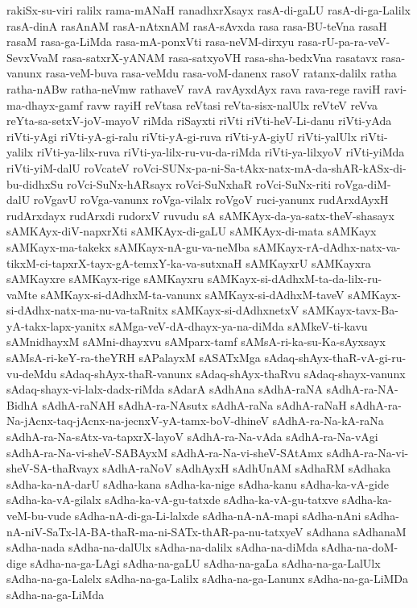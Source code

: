 {rakiSx-su-viri
ralilx
rama-mANaH
ranadhxrXsayx
rasA-di-gaLU
rasA-di-ga-Lalilx
rasA-dinA
rasAnAM
rasA-nAtxnAM
rasA-sAvxda
rasa
rasa-BU-teVna
rasaH
rasaM
rasa-ga-LiMda
rasa-mA-ponxVti
rasa-neVM-dirxyu
rasa-rU-pa-ra-veV-SevxVvaM
rasa-satxrX-yANAM
rasa-satxyoVH
rasa-sha-bedxVna
rasatavx
rasa-vanunx
rasa-veM-buva
rasa-veMdu
rasa-voM-danenx
rasoV
ratanx-dalilx
ratha
ratha-nABw
ratha-neVmw
rathaveV
ravA
ravAyxdAyx
rava
rava-rege
raviH
ravi-ma-dhayx-gamf
ravw
rayiH
reVtasa
reVtasi
reVta-sisx-nalUlx
reVteV
reVva
reYta-sa-setxV-joV-mayoV
riMda
riSayxti
riVti
riVti-heV-Li-danu
riVti-yAda
riVti-yAgi
riVti-yA-gi-ralu
riVti-yA-gi-ruva
riVti-yA-giyU
riVti-yalUlx
riVti-yalilx
riVti-ya-lilx-ruva
riVti-ya-lilx-ru-vu-da-riMda
riVti-ya-lilxyoV
riVti-yiMda
riVti-yiM-dalU
roVcateV
roVci-SUNx-pa-ni-Sa-tAkx-natx-mA-da-shAR-kASx-di-bu-didhxSu
roVci-SuNx-hARsayx
roVci-SuNxhaR
roVci-SuNx-riti
roVga-diM-dalU
roVgavU
roVga-vanunx
roVga-vilalx
roVgoV
ruci-yanunx
rudArxdAyxH
rudArxdayx
rudArxdi
rudorxV
ruvudu
sA
sAMKAyx-da-ya-satx-theV-shasayx
sAMKAyx-diV-napxrXti
sAMKAyx-di-gaLU
sAMKAyx-di-mata
sAMKayx
sAMKayx-ma-takekx
sAMKayx-nA-gu-va-neMba
sAMKayx-rA-dAdhx-natx-va-tikxM-ci-tapxrX-tayx-gA-temxY-ka-va-sutxnaH
sAMKayxrU
sAMKayxra
sAMKayxre
sAMKayx-rige
sAMKayxru
sAMKayx-si-dAdhxM-ta-da-lilx-ru-vaMte
sAMKayx-si-dAdhxM-ta-vanunx
sAMKayx-si-dAdhxM-taveV
sAMKayx-si-dAdhx-natx-ma-nu-va-taRnitx
sAMKayx-si-dAdhxnetxV
sAMKayx-tavx-Ba-yA-takx-lapx-yanitx
sAMga-veV-dA-dhayx-ya-na-diMda
sAMkeV-ti-kavu
sAMnidhayxM
sAMni-dhayxvu
sAMparx-tamf
sAMsA-ri-ka-su-Ka-sAyxsayx
sAMsA-ri-keY-ra-theYRH
sAPalayxM
sASATxMga
sAdaq-shAyx-thaR-vA-gi-ru-vu-deMdu
sAdaq-shAyx-thaR-vanunx
sAdaq-shAyx-thaRvu
sAdaq-shayx-vanunx
sAdaq-shayx-vi-lalx-dadx-riMda
sAdarA
sAdhAna
sAdhA-raNA
sAdhA-ra-NA-BidhA
sAdhA-raNAH
sAdhA-ra-NAsutx
sAdhA-raNa
sAdhA-raNaH
sAdhA-ra-Na-jAcnx-taq-jAcnx-na-jecnxV-yA-tamx-boV-dhineV
sAdhA-ra-Na-kA-raNa
sAdhA-ra-Na-sAtx-va-tapxrX-layoV
sAdhA-ra-Na-vAda
sAdhA-ra-Na-vAgi
sAdhA-ra-Na-vi-sheV-SABAyxM
sAdhA-ra-Na-vi-sheV-SAtAmx
sAdhA-ra-Na-vi-sheV-SA-thaRvayx
sAdhA-raNoV
sAdhAyxH
sAdhUnAM
sAdhaRM
sAdhaka
sAdha-ka-nA-darU
sAdha-kana
sAdha-ka-nige
sAdha-kanu
sAdha-ka-vA-gide
sAdha-ka-vA-gilalx
sAdha-ka-vA-gu-tatxde
sAdha-ka-vA-gu-tatxve
sAdha-ka-veM-bu-vude
sAdha-nA-di-ga-Li-lalxde
sAdha-nA-nA-mapi
sAdha-nAni
sAdha-nA-niV-SaTx-lA-BA-thaR-ma-ni-SATx-thAR-pa-nu-tatxyeV
sAdhana
sAdhanaM
sAdha-nada
sAdha-na-dalUlx
sAdha-na-dalilx
sAdha-na-diMda
sAdha-na-doM-dige
sAdha-na-ga-LAgi
sAdha-na-gaLU
sAdha-na-gaLa
sAdha-na-ga-LalUlx
sAdha-na-ga-Lalelx
sAdha-na-ga-Lalilx
sAdha-na-ga-Lanunx
sAdha-na-ga-LiMDa
sAdha-na-ga-LiMda
}
